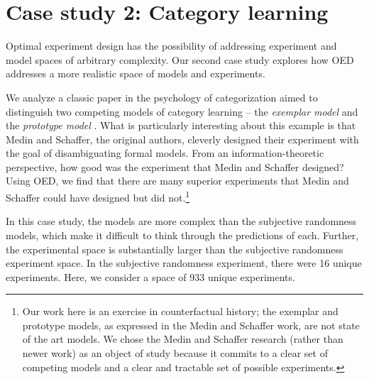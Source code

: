 \documentclass{article}
\newcommand{\lou}[1]{\textcolor{orange}{[lou: #1]}}
\begin{document}
\section{Case study 2: Category learning}

Optimal experiment design has the possibility of addressing experiment and model spaces of arbitrary complexity. Our second case study explores how OED addresses a more realistic space of models and experiments.

We analyze a classic paper in the psychology of categorization aimed to distinguish two competing models of category learning -- the \emph{exemplar model} and the \emph{prototype model} \cite{medin78:pr}. What is particularly interesting about this example is that Medin and Schaffer, the original authors, cleverly designed their experiment with the goal of disambiguating formal models.
From an information-theoretic perspective, how good was the experiment that Medin and Schaffer designed?
Using OED, we find that there are many superior experiments that Medin and Schaffer could have designed but did not.\footnote{Our work here is an exercise in counterfactual history; the exemplar and prototype models, as expressed in the Medin and Schaffer work, are not state of the art models. We chose the Medin and Schaffer research (rather than newer work) as an object of study because it commits to a clear set of competing models and a clear and tractable set of possible experiments.}

In this case study, the models are more complex than the subjective randomness models, which make it difficult to think through the predictions of each.
Further, the experimental space is substantially larger than the subjective randomness experiment space. In the subjective randomness experiment, there were 16 unique experiments. Here, we consider a space of 933 unique experiments.


%
%
%
%
\end{document}
